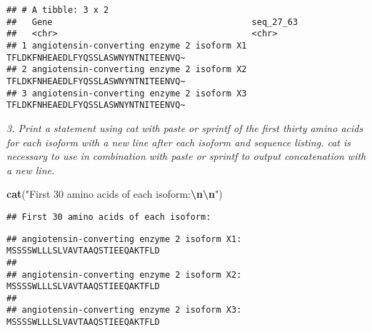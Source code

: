 \documentclass[
]{article}
\newenvironment{Shaded}{\begin{snugshade}}{\end{snugshade}}
\newcommand{\CommentTok}[1]{\textcolor[rgb]{0.56,0.35,0.01}{\textit{#1}}}
\newcommand{\ControlFlowTok}[1]{\textcolor[rgb]{0.13,0.29,0.53}{\textbf{#1}}}
\newcommand{\DecValTok}[1]{\textcolor[rgb]{0.00,0.00,0.81}{#1}}
\newcommand{\FunctionTok}[1]{\textcolor[rgb]{0.13,0.29,0.53}{\textbf{#1}}}
\newcommand{\NormalTok}[1]{#1}
\newcommand{\OtherTok}[1]{\textcolor[rgb]{0.56,0.35,0.01}{#1}}
\newcommand{\SpecialCharTok}[1]{\textcolor[rgb]{0.81,0.36,0.00}{\textbf{#1}}}
\newcommand{\StringTok}[1]{\textcolor[rgb]{0.31,0.60,0.02}{#1}}
\begin{document}
\begin{verbatim}
## # A tibble: 3 x 2
##   Gene                                       seq_27_63                          
##   <chr>                                      <chr>                              
## 1 angiotensin-converting enzyme 2 isoform X1 TFLDKFNHEAEDLFYQSSLASWNYNTNITEENVQ~
## 2 angiotensin-converting enzyme 2 isoform X2 TFLDKFNHEAEDLFYQSSLASWNYNTNITEENVQ~
## 3 angiotensin-converting enzyme 2 isoform X3 TFLDKFNHEAEDLFYQSSLASWNYNTNITEENVQ~
\end{verbatim}

\emph{3. Print a statement using cat with paste or sprintf of the first
thirty amino acids for each isoform with a new line after each isoform
and sequence listing. cat is necessary to use in combination with paste
or sprintf to output concatenation with a new line.}

\begin{Shaded}
\begin{Highlighting}[]
\FunctionTok{cat}\NormalTok{(}\StringTok{"First 30 amino acids of each isoform:}\SpecialCharTok{\textbackslash{}n\textbackslash{}n}\StringTok{"}\NormalTok{)}
\end{Highlighting}
\end{Shaded}

\begin{verbatim}
## First 30 amino acids of each isoform:
\end{verbatim}

\begin{Shaded}
\end{Shaded}

\begin{verbatim}
## angiotensin-converting enzyme 2 isoform X1: MSSSSWLLLSLVAVTAAQSTIEEQAKTFLD
## 
## angiotensin-converting enzyme 2 isoform X2: MSSSSWLLLSLVAVTAAQSTIEEQAKTFLD
## 
## angiotensin-converting enzyme 2 isoform X3: MSSSSWLLLSLVAVTAAQSTIEEQAKTFLD
\end{verbatim}
\end{document}
